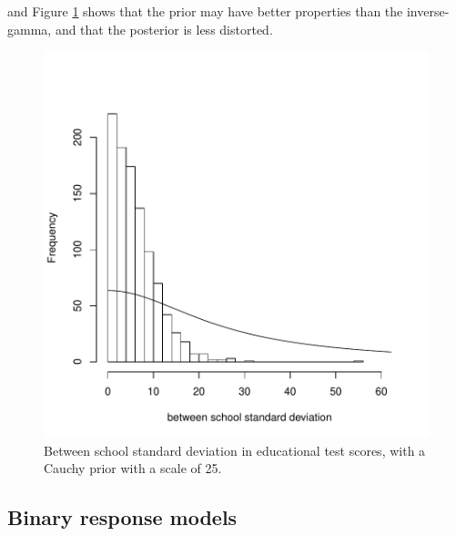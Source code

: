\documentclass{article}
\begin{document}
\begin{Schunk}
\end{Schunk}

and Figure \ref{school3-fig} shows that the prior may have better properties than the inverse-gamma, and that the posterior is less distorted.


\begin{figure}[!h]
\begin{center}
\includegraphics{Lecture8-018}
\end{center}
\caption{Between school standard deviation in educational test scores, with a Cauchy prior with a scale of 25.}
\label{school3-fig}
\end{figure}

\subsection{Binary response models}
\end{document}

